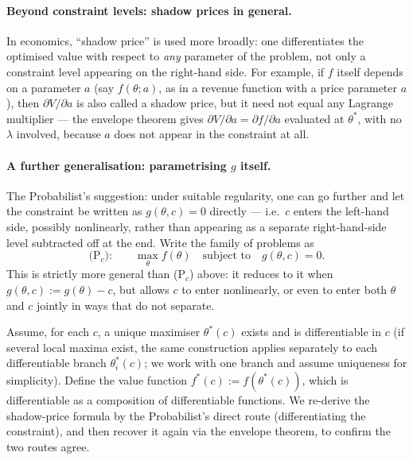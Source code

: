 \documentclass[a4paper,oneside,12pt]{extarticle}
\theoremstyle{plain}
\theoremstyle{definition}
\theoremstyle{remark}
\begin{document}
\paragraph{Beyond constraint levels: shadow prices in general.}
In economics, ``shadow price'' is used more broadly: one
differentiates the optimised value with respect to \emph{any}
parameter of the problem, not only a constraint level appearing
on the right-hand side.  For example, if $f$ itself depends on a
parameter $a$ (say $f(\theta;a)$, as in a revenue function with a
price parameter $a$), then $\partial V/\partial a$ is also called
a shadow price, but it need not equal any Lagrange multiplier ---
the envelope theorem gives $\partial V/\partial a
= \partial f/\partial a$ evaluated at $\theta^*$, with no $\lambda$
involved, because $a$ does not appear in the constraint at all.

\paragraph{A further generalisation: parametrising $g$ itself.}
The Probabilist's suggestion: under suitable regularity, one can go further
and let the constraint be written as $g(\theta,c)=0$ directly ---
i.e.\ $c$ enters the left-hand side, possibly nonlinearly, rather
than appearing as a separate right-hand-side level subtracted off
at the end.  Write the family of problems as
\[
  \text{(P$_c$):} \qquad \max_\theta f(\theta)
  \quad\text{subject to}\quad g(\theta,c) = 0.
\]
This is strictly more general than (P$_c$) above: it reduces to it
when $g(\theta,c) := g(\theta) - c$, but allows $c$ to enter
nonlinearly, or even to enter both $\theta$ and $c$ jointly in ways
that do not separate.

Assume, for each $c$, a unique maximiser $\theta^*(c)$ exists and is
differentiable in $c$ (if several local maxima exist, the same
construction applies separately to each differentiable branch
$\theta^*_i(c)$; we work with one branch and assume uniqueness for
simplicity).  Define the value function
$f^*(c) := f(\theta^*(c))$, which is differentiable as a composition
of differentiable functions.  We re-derive the shadow-price formula
by the Probabilist's direct route (differentiating the constraint), and then
recover it again via the envelope theorem, to confirm the two routes
agree.
\end{document}
